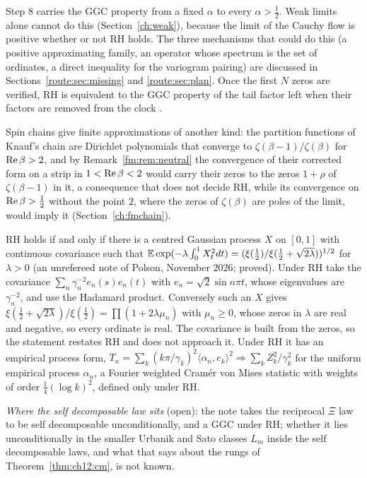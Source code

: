 Step 8 carries the GGC property from a fixed $\alpha$ to every $\alpha>\frac12$. Weak limits alone cannot do this (Section~\ref{ch:weak}), because the limit of the Cauchy flow is positive whether or not RH holds. The three mechanisms that could do this (a positive approximating family, an operator whose spectrum is the set of ordinates, a direct inequality for the variogram pairing) are discussed in Sections~\ref{route:sec:missing} and \ref{route:sec:plan}. Once the first $N$ zeros are verified, RH is equivalent to the GGC property of the tail factor left when their factors are removed from the clock \cite[Corollary 18.11]{P26}.

Spin chains give finite approximations of another kind: the partition functions of Knauf's chain are Dirichlet polynomials that converge to $\zeta(\beta-1)/\zeta(\beta)$ for $\operatorname{Re}\beta>2$, and by Remark~\ref{fm:rem:neutral} the convergence of their corrected form on a strip in $1<\operatorname{Re}\beta<2$ would carry their zeros to the zeros $1+\rho$ of $\zeta(\beta-1)$ in it, a consequence that does not decide RH, while its convergence on $\operatorname{Re}\beta>\frac12$ without the point $2$, where the zeros of $\zeta(\beta)$ are poles of the limit, would imply it (Section~\ref{ch:fmchain}).

\begin{remark}\label{rem:ch25:gp}
RH holds if and only if there is a centred Gaussian process $X$ on $[0,1]$ with continuous covariance such that $\mathbb{E}\exp(-\lambda\int_0^1X_t^2dt)=(\xi(\frac12)/\xi(\frac12+\sqrt{2\lambda}))^{1/2}$ for $\lambda>0$ (an unrefereed note of Polson, November 2026; proved). Under RH take the covariance $\sum_n\gamma_n^{-2}e_n(s)e_n(t)$ with $e_n=\sqrt2\sin n\pi t$, whose eigenvalues are $\gamma_n^{-2}$, and use the Hadamard product. Conversely such an $X$ gives $\xi(\frac12+\sqrt{2\lambda})/\xi(\frac12)=\prod(1+2\lambda\mu_n)$ with $\mu_n\ge0$, whose zeros in $\lambda$ are real and negative, so every ordinate is real. The covariance is built from the zeros, so the statement restates RH and does not approach it. Under RH it has an empirical process form, $T_n=\sum_k(k\pi/\gamma_k)^2\langle\alpha_n,e_k\rangle^2\Rightarrow\sum_kZ_k^2/\gamma_k^2$ for the uniform empirical process $\alpha_n$, a Fourier weighted Cram\'er von Mises statistic with weights of order $\frac14(\log k)^2$, defined only under RH.
\end{remark}

\emph{Where the self decomposable law sits} (open): the note takes the reciprocal $\Xi$ law to be self decomposable unconditionally, and a GGC under RH; whether it lies unconditionally in the smaller Urbanik and Sato classes $L_m$ inside the self decomposable laws, and what that says about the rungs of Theorem~\ref{thm:ch12:cm}, is not known.

